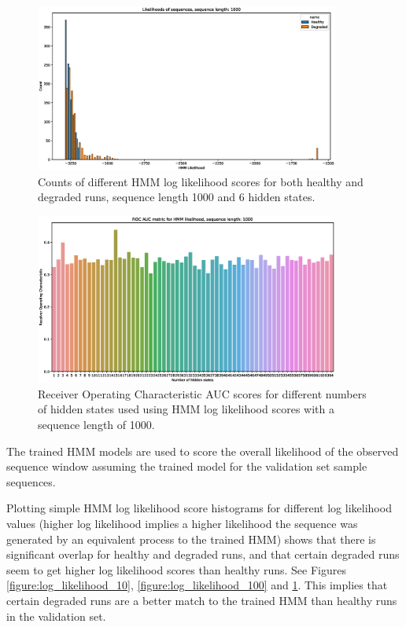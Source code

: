 \documentclass[journal]{IEEEtran}
\begin{document}
\begin{figure}[tb]
 \centering
 \includegraphics[width=10cm,keepaspectratio=true]{./hmm_histograms_1000.eps}
 \caption{Counts of different HMM log likelihood scores for both healthy and degraded runs, sequence length 1000 and 6 hidden states.}
 \label{figure:log_likelihood_1000}
\end{figure}

\begin{figure}[tb]
 \centering
 \includegraphics[width=10cm,keepaspectratio=true]{./roc_hmm_score_1000.eps}
 \caption{Receiver Operating Characteristic AUC scores for different numbers of hidden states used using HMM log likelihood scores with a sequence length of 1000.}
 \label{figure:roc_log_likelihoods_1000}
\end{figure}

The trained HMM models are used to score the overall likelihood of the observed sequence window assuming the trained model for the validation set sample sequences.

Plotting simple HMM log likelihood score histograms for different log likelihood values (higher log likelihood implies a higher likelihood the sequence was generated by an equivalent process to the trained HMM) shows that there is significant overlap for healthy and degraded runs, and that certain degraded runs seem to get higher log likelihood scores than healthy runs. See Figures \ref{figure:log_likelihood_10}, \ref{figure:log_likelihood_100} and \ref{figure:log_likelihood_1000}. This implies that certain degraded runs are a better match to the trained HMM than healthy runs in the validation set.
\end{document}
